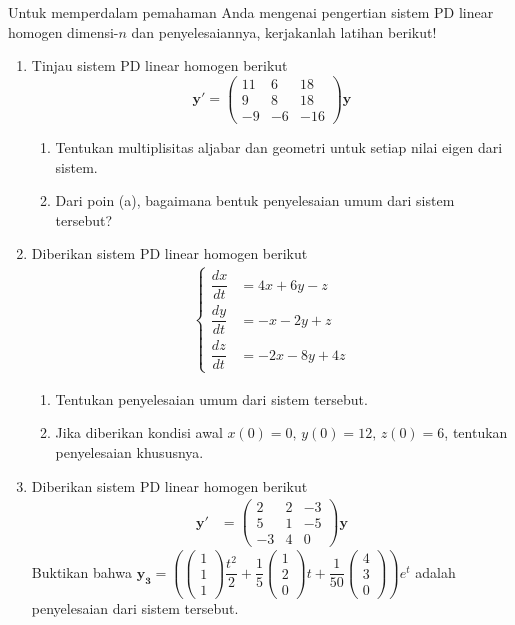 \documentclass[a4paper]{article}
\theoremstyle{definisi}
\numberwithin{equation}{section}
\begin{document}
  \newpage
  \noindent Untuk memperdalam pemahaman Anda mengenai pengertian sistem PD linear homogen dimensi-$n$ dan penyelesaiannya, kerjakanlah latihan berikut!
  \begin{enumerate}
    \item Tinjau sistem PD linear homogen berikut
    \begin{equation*}
      \mathbf{y'}=\begin{pmatrix}
        11&6&18\\
        9&8&18\\
        -9&-6&-16
      \end{pmatrix}\mathbf{y}
    \end{equation*}
    \begin{enumerate}
      \item Tentukan multiplisitas aljabar dan geometri untuk setiap nilai eigen dari sistem.
      \item Dari poin (a), bagaimana bentuk penyelesaian umum dari sistem tersebut?
    \end{enumerate}
    \item Diberikan sistem PD linear homogen berikut
    \begin{align*}
      \begin{cases}
        \dfrac{dx}{dt}&=4x+6y-z\\
        \dfrac{dy}{dt}&=-x-2y+z\\
        \dfrac{dz}{dt}&=-2x-8y+4z
      \end{cases}
    \end{align*}
    \begin{enumerate}
      \item Tentukan penyelesaian umum dari sistem tersebut.
      \item Jika diberikan kondisi awal $x(0)=0,\,y(0)=12,\,z(0)=6$, tentukan penyelesaian khususnya.
    \end{enumerate}
    \item Diberikan sistem PD linear homogen berikut
    \begin{align*}
      \mathbf{y'}&=\begin{pmatrix}
        2&2&-3\\
        5&1&-5\\
        -3&4&0
      \end{pmatrix}\mathbf{y}
    \end{align*}
    Buktikan bahwa $\mathbf{y_3}=\left(\begin{pmatrix}
      1\\1\\1
    \end{pmatrix}\dfrac{t^2}{2}+\dfrac{1}{5}\begin{pmatrix}
      1\\2\\0
    \end{pmatrix}t+\dfrac{1}{50}\begin{pmatrix}
      4\\3\\0
    \end{pmatrix}\right)e^{t}$ adalah penyelesaian dari sistem tersebut.
    

\end{enumerate}
\end{document}
